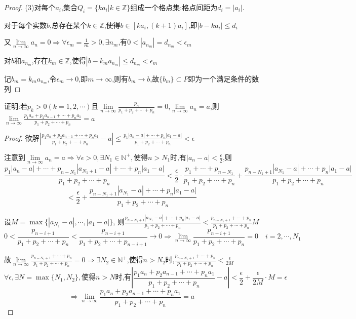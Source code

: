 \begin{proof}
    (3)对每个$a_i$,集合$Q_i=\{ka_i|k\in \mathbb{Z}\}$组成一个格点集:格点间距为$d_i=|a_i|$.

    对于每个实数$b$,总存在某个$k\in \mathbb{Z}$,使得$b\in[ka_i,(k+1)a_i]$,即$|b-ka_i|\le d_i$

    又$\lim\limits_{n\to \infty}a_n=0\Longrightarrow \forall \epsilon_m=\frac{1}{m}>0,\exists n_m$,有$0<|a_{n_m}|=d_{n_m}<\epsilon_m$

    对$b$和$a_{n_m}$,存在$k_m\in \mathbb{Z}$,使得$|b-k_ma_{n_m}|\le d_{n_m}<\epsilon_m$

    记$b_m=k_ma_{n_m}$,令$\epsilon_m\to 0$,即$m\to \infty$,则有$b_m\to b$,故$\{b_m\}\subset P$即为一个满足条件的数列
\end{proof}

\begin{example}
    证明:若$p_k>0(k=1,2,\cdots)$且$\lim\limits_{n\to \infty}\frac{p_n}{p_1+p_2+\cdots+p_n}=0$,$\lim\limits_{n \to \infty} a_n=a$,则$\lim\limits_{n\to \infty}\frac{p_1a_n+p_2a_{n-1}+\cdots+p_na_1}{p_1+p_2+\cdots+p_n}=a$
\end{example}

\begin{proof}

    欲解$|\frac{p_1a_n+p_2a_{n-1}+\cdots+p_na_1}{p_1+p_2+\cdots+p_n}-a|\le \frac{p_1|a_n-a|+\cdots+p_n|a_1-a|}{p_1+p_2+\cdots+p_n}<\epsilon$

    注意到$\lim\limits_{n\to \infty} a_n=a \Longrightarrow\forall \epsilon>0,\exists N_1 \in \mathbb{N}^+,\mbox{使得}n>N_1\mbox{时,有}|a_n-a|<\frac{\epsilon}{2}$,则
    $$\frac{p_1|a_n-a|+\cdots+p_{n-N_1}|a_{N_1+1}-a|+\cdots+p_n|a_1-a|}{p_1+p_2+\cdots+p_n}< \frac{\epsilon}{2}\cdot \frac{p_1+\cdots+p_{n-N_1}}{p_1+p_2+\cdots+p_n}+\frac{p_{n-N_1+1}|a_{N_1}-a|+\cdots+p_n|a_1-a|}{p_1+p_2+\cdots+p_n}$$
    $$<\frac{\epsilon}{2}+\frac{p_{n-N_1+1}|a_{N_1}-a|+\cdots+p_n|a_1-a|}{p_1+p_2+\cdots+p_n}$$

    设$M=\max \{|a_{N_1}-a|,\cdots,|a_1-a|\}$,
    则$\frac{p_{n-N_1+1}|a_{N_1}-a|+\cdots+p_n|a_1-a|}{p_1+p_2+\cdots+p_n}<\frac{p_{n-N_1+1}+\cdots+p_n}{p_1+p_2+\cdots+p_n}M$
    \begin{equation*}
        0<\frac{p_{n-i+1}}{p_1+p_2+\cdots+p_n}<\frac{p_{n-i+1}}{p_1+p_2+\cdots+p_{n-i+1}}\to 0\Longrightarrow \lim\limits_{n\to \infty}\frac{p_{n-i+1}}{p_1+p_2+\cdots+p_n}=0\quad i=2,\cdots,N_1
    \end{equation*}

    故$\lim\limits_{n\to \infty} \frac{p_{n-N_1+1}+\cdots+p_n}{p_1+p_2+\cdots+p_n} = 0 
    \Longrightarrow
    \exists N_2\in \mathbb{N}^+$,使得$n>N_2$时,$\frac{p_{n-N_1+1}+\cdots+p_n}{p_1+p_2+\cdots+p_n}<\frac{\epsilon}{2M}$
    $$\forall \epsilon,\exists N=\max \{N_1,N_2\},\mbox{使得}n>N\mbox{时,有}|\frac{p_1a_n+p_2a_{n-1}+\cdots+p_na_1}{p_1+p_2+\cdots+p_n}-a|<\frac{\epsilon}{2}+\frac{\epsilon}{2M}\cdot M=\epsilon$$ 
    $$\Longrightarrow \lim\limits_{n\to \infty}\frac{p_1a_n+p_2a_{n-1}+\cdots+p_na_1}{p_1+p_2+\cdots+p_n}=a$$
\end{proof}

